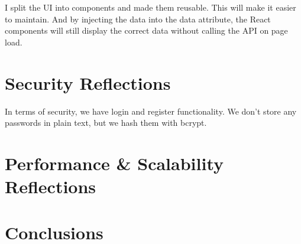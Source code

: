 \documentclass[letterpaper,twocolumn]{article}
\begin{document}
I split the UI into components and made them reusable.
This will make it easier to maintain.
And by injecting the data into the data attribute,
the React components will still display the correct data without calling the API on page load.

\section{Security Reflections}

In terms of security, we have login and register functionality.
We don't store any passwords in plain text, but we hash them with bcrypt.



\section{Performance \& Scalability Reflections}

\section{Conclusions}
\end{document}
